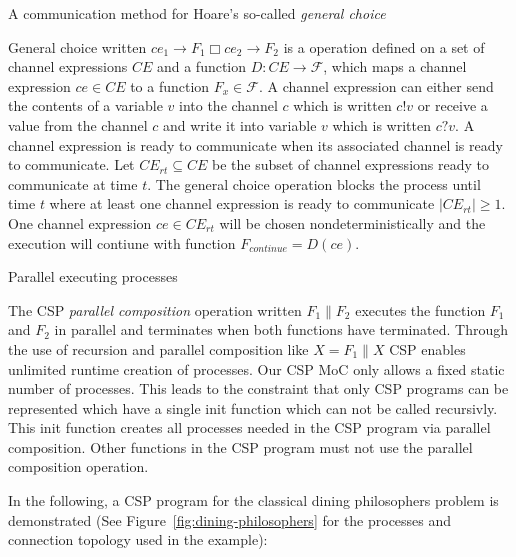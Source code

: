 \begin{requirement}\label{requirement-csp-general-choice}
  A communication method for Hoare's so-called \emph{general choice}
  
  General choice written $ce_{1} \to F_1 \Box ce_{2} \to F_2$
  is a operation defined on a set of channel expressions $CE$ and
  a function $D: CE \to \mathcal{F}$, which maps a channel expression
  $ce \in CE$ to a function $F_{x} \in \mathcal{F}$. A channel
  expression can either send the contents of a variable $v$ into
  the channel $c$ which is written $c!v$ or receive a value from
  the channel $c$ and write it into variable $v$ which is written
  $c?v$. A channel expression is ready to communicate when its
  associated channel is ready to communicate.
  Let $CE_{rt} \subseteq CE$ be the subset of channel expressions
  ready to communicate at time $t$. The general choice operation
  blocks the process until time $t$ where at least one channel expression
  is ready to communicate $|CE_{rt}| \ge 1$. One channel expression
  $ce \in CE_{rt}$ will be chosen nondeterministically and the
  execution will contiune with function $F_{continue} = D(ce)$.
\end{requirement}

\begin{requirement}\label{requirement-csp-concurrent-processes}
  Parallel executing processes
  
  The CSP \emph{parallel composition} operation written $F_1 \| F_2$ executes the
  function $F_1$ and $F_2$ in parallel and terminates when both functions
  have terminated. Through the use of recursion and parallel composition
  like $X = F_1 \| X$ CSP enables unlimited runtime creation of processes.
  Our CSP MoC only allows a fixed static number of processes. This
  leads to the constraint that only CSP programs can be represented which
  have a single init function which can not be called recursivly. This init
  function creates all processes needed in the CSP program via parallel composition.
  Other functions in the CSP program must not use the parallel composition
  operation.
\end{requirement}

%  

In the following, a CSP program for the classical dining
philosophers problem is demonstrated (See Figure~\ref{fig:dining-philosophers}
for the processes and connection topology used in the example):

